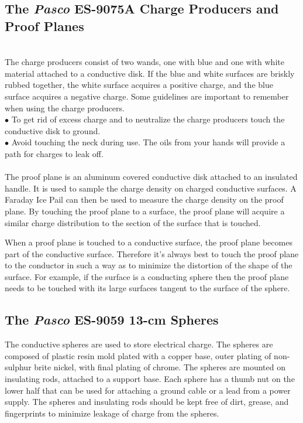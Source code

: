 {{\subsection{The {\it Pasco} ES-9075A Charge Producers and Proof Planes}
\\
The charge producers consist of two wands,
one with blue and one with white material attached to a conductive
disk. If the blue and white surfaces are briskly rubbed together,
the white surface acquires a positive charge, and the blue surface
acquires a negative charge.  Some guidelines are important to
remember when
using the charge producers.\\

\noindent $\bullet$ To get rid of excess charge and to neutralize
the charge
producers touch the conductive disk to ground. \\
$\bullet$ Avoid touching the neck during use.  The oils from your
hands will provide a path for charges to leak off.\\

\\
The proof plane is an aluminum covered conductive disk attached to
an insulated handle.  It is used to sample the charge density on
charged conductive surfaces.  A Faraday Ice Pail can then be used
to measure the charge density on the proof plane.  By touching the
proof plane to a surface, the proof plane will acquire a similar
charge distribution to the section of the surface that is touched.

When a proof plane is touched to a conductive surface, the proof
plane becomes part of the conductive surface.  Therefore it's
always best to touch the proof plane to the conductor in such a
way as to minimize the distortion of the shape of the surface. For
example, if the surface is a conducting sphere then the proof plane
needs to be touched with its large surfaces tangent to the surface
of the sphere.


\subsection{The {\it Pasco} ES-9059 13-cm Spheres}
The conductive spheres are used to store electrical charge.  The
spheres are composed of plastic resin mold plated with a copper
base, outer plating of non-sulphur brite nickel, with final
plating of chrome.  The spheres are mounted on insulating rods,
attached to a support base.  Each sphere has a thumb nut on the
lower half that can be used for attaching a ground cable or a lead
from a power supply.  The spheres and insulating rods should be
kept free of dirt, grease, and fingerprints to minimize leakage of
charge from the spheres.

}}
